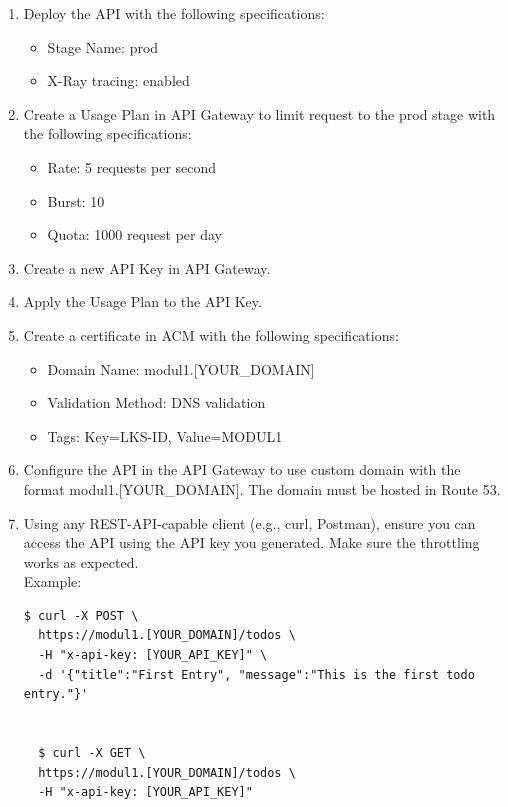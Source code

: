\documentclass{article}
\begin{document}
\begin{enumerate}
  \item Deploy the API with the following specifications:
  \begin{itemize}
      \item Stage Name: prod
      \item X-Ray tracing: enabled
  \end{itemize}
  \item Create a Usage Plan in API Gateway to limit request to the prod stage with the following specifications:
  \begin{itemize}
      \item Rate: 5 requests per second
      \item Burst: 10
      \item Quota: 1000 request per day
  \end{itemize}
  \item Create a new API Key in API Gateway.
  \item Apply the Usage Plan to the API Key.
  \item Create a certificate in ACM with the following specifications:
  \begin{itemize}
      \item Domain Name: modul1.[YOUR\_DOMAIN]
      \item Validation Method: DNS validation
      \item Tags: Key=LKS-ID, Value=MODUL1
  \end{itemize}
  \item Configure the API in the API Gateway to use custom domain with the format modul1.[YOUR\_DOMAIN]. The domain must be hosted in Route 53. 
  \item Using any REST-API-capable client (e.g., curl, Postman), ensure you can access the API using the API key you generated. Make sure the throttling works as expected.\\
  Example: 
  \begin{lstlisting}[style=bashStyle]
  $ curl -X POST \
  https://modul1.[YOUR_DOMAIN]/todos \
  -H "x-api-key: [YOUR_API_KEY]" \
  -d '{"title":"First Entry", "message":"This is the first todo entry."}'


  $ curl -X GET \
  https://modul1.[YOUR_DOMAIN]/todos \
  -H "x-api-key: [YOUR_API_KEY]"
  \end{lstlisting}
\end{enumerate}
\end{document}
